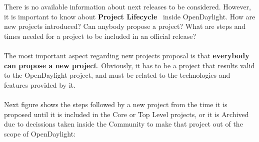 \documentclass[a4paper, 12pt]{book}
\begin{document}
There is no available information about next releases to be considered. However, it is important to know about \textbf{Project Lifecycle}~\cite{OpenDaylightLifecycle} inside OpenDaylight. How are new projects introduced? Can anybody propose a project? What are steps and times needed for a project to be included in an official release?\\
\\
The most important aspect regarding new projects proposal is that \textbf{everybody can propose a new project}. Obviously, it has to be a project that results valid to the OpenDaylight project, and must be related to the technologies and features provided by it.\\
\\
Next figure shows the steps followed by a new project from the time it is proposed until it is included in the Core or Top Level projects, or it is Archived due to decissions taken inside the Community to make that project out of the scope of OpenDaylight:
\end{document}
